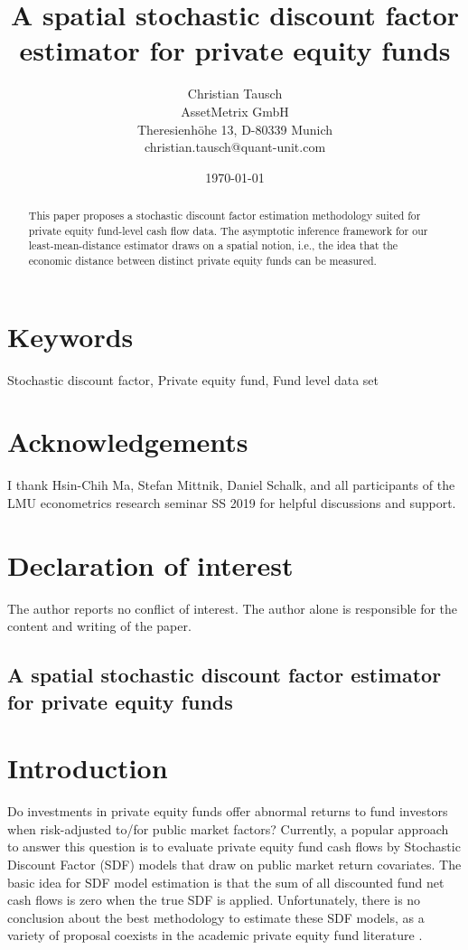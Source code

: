 \documentclass[12pt]{article}
\title{A spatial stochastic discount factor estimator for private equity funds}
\author{
	Christian Tausch  \\
	AssetMetrix GmbH  \\
	Theresienh\"{o}he 13, D-80339 Munich \\
	christian.tausch@quant-unit.com \\
	}
\date{\today}
\begin{document}
\maketitle


\section*{Keywords}
Stochastic discount factor, Private equity fund, Fund level data set


\section*{Acknowledgements}
I thank Hsin-Chih Ma, Stefan Mittnik, Daniel Schalk, and all participants of the LMU econometrics research seminar SS 2019 for helpful discussions and support.


\section*{Declaration of interest}
The author reports no conflict of interest. 
The author alone is responsible for the content and writing of the paper.


\newpage

\begin{center} 
\section*{A spatial stochastic discount factor estimator for private equity funds}
\end{center}



\begin{abstract}
This paper proposes a stochastic discount factor estimation methodology suited for private equity fund-level cash flow data.
The asymptotic inference framework for our least-mean-distance estimator draws on a spatial notion, i.e., the idea that the economic distance between distinct private equity funds can be measured.
\end{abstract}

\section{Introduction}
Do investments in private equity funds offer abnormal returns to fund investors when risk-adjusted to/for public market factors?
Currently, a popular approach to answer this question is to evaluate private equity fund cash flows by Stochastic Discount Factor (SDF) models that draw on public market return covariates.
The basic idea for SDF model estimation is that the sum of all discounted fund net cash flows is zero when the true SDF is applied.
Unfortunately, there is no conclusion about the best methodology to estimate these SDF models, as a variety of proposal coexists in the academic private equity fund literature \citep{DLP12,KN16,ACGP18,GSW19}.
\end{document}
